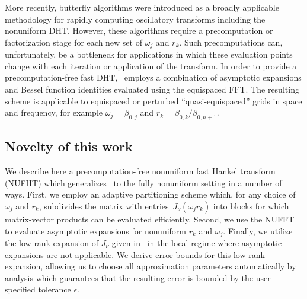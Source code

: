 More recently, butterfly algorithms \cite{oneil2010algorithm, li2015butterfly,
pang2020interpolative} were introduced as a broadly applicable methodology for
rapidly computing oscillatory transforms including the nonuniform DHT. However,
these algorithms require a precomputation or factorization stage for each new
set of $\omega_j$ and $r_k$. Such precomputations can, unfortunately, be a
bottleneck for applications in which these evaluation points change with each
iteration or application of the transform. In order to provide a
precomputation-free fast DHT,~\cite{townsend2015fast} employs a combination of
asymptotic expansions and Bessel function identities evaluated using the
equispaced FFT. The resulting scheme is applicable to equispaced or perturbed
``quasi-equispaced'' grids in space and frequency, for example $\omega_j =
\beta_{0,j}$ and $r_k = \beta_{0,k} / \beta_{0,n+1}$.

\subsection*{Novelty of this work}
\label{sec:novelty}


We describe here a precomputation-free nonuniform fast Hankel transform (NUFHT)
which generalizes~\cite{townsend2015fast} to the fully nonuniform setting in a
number of ways. First, we employ an adaptive partitioning scheme which, for any
choice of $\omega_j$ and $r_k$, subdivides the matrix with
entries~$J_\nu(\omega_j r_k)$ into blocks for which matrix-vector products can
be evaluated efficiently. Second, we use the NUFFT to evaluate asymptotic
expansions for nonuniform $r_k$ and $\omega_j$. Finally, we utilize the low-rank
expansion of $J_\nu$ given in~\cite{wimp1962polynomial} in the local regime
where asymptotic expansions are not applicable. We derive error bounds for this
low-rank expansion, allowing us to choose all approximation parameters
automatically by analysis which guarantees that the resulting error is bounded
by the user-specified tolerance $\epsilon$.

